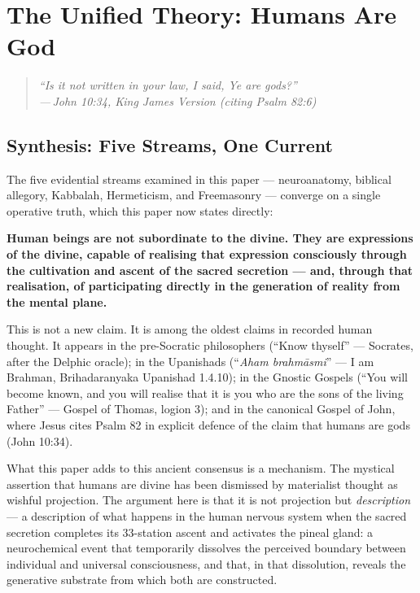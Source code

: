 \documentclass[12pt, a4paper]{article}
\newcommand{\epigraph}[2]{%
  \begin{quote}
    \itshape ``#1''\\[0.3em]
    \normalfont\small\hfill ---\,#2
  \end{quote}
}
\begin{document}
\section{The Unified Theory: Humans Are God}
\label{sec:unified}

\epigraph{Is it not written in your law, I said, Ye are gods?}{John 10:34,
King James Version (citing Psalm 82:6)}

\subsection{Synthesis: Five Streams, One Current}

The five evidential streams examined in this paper — neuroanatomy, biblical
allegory, Kabbalah, Hermeticism, and Freemasonry — converge on a single
operative truth, which this paper now states directly:

\textbf{Human beings are not subordinate to the divine. They are expressions
of the divine, capable of realising that expression consciously through the
cultivation and ascent of the sacred secretion — and, through that realisation,
of participating directly in the generation of reality from the mental plane.}

This is not a new claim. It is among the oldest claims in recorded human
thought. It appears in the pre-Socratic philosophers (``Know thyself'' —
Socrates, after the Delphic oracle); in the Upanishads (``\emph{Aham
brahm\=asmi}'' — I am Brahman, Brihadaranyaka Upanishad 1.4.10); in
the Gnostic Gospels (``You will become known, and you will realise that it is
you who are the sons of the living Father'' — Gospel of Thomas,
logion 3); and in the canonical Gospel of John, where Jesus cites Psalm 82
in explicit defence of the claim that humans are gods (John 10:34).

What this paper adds to this ancient consensus is a mechanism. The mystical
assertion that humans are divine has been dismissed by materialist thought as
wishful projection. The argument here is that it is not projection but
\emph{description} — a description of what happens in the human nervous system
when the sacred secretion completes its 33-station ascent and activates the
pineal gland: a neurochemical event that temporarily dissolves the
perceived boundary between individual and universal consciousness, and that,
in that dissolution, reveals the generative substrate from which both are
constructed.
\end{document}
